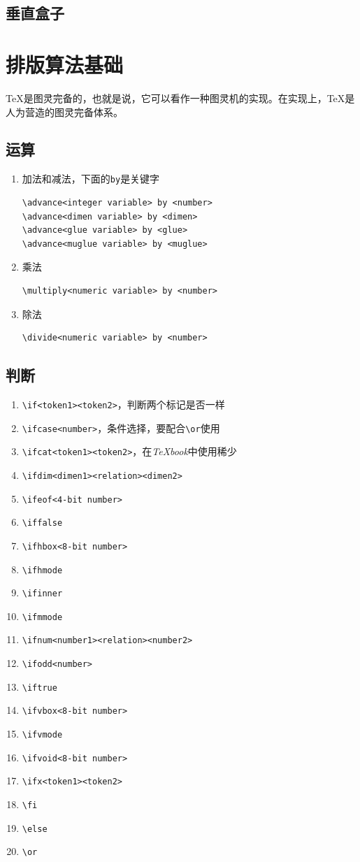 \documentclass{article}
\newcommand{\TeXbook}{\textit{\TeX book}}
\begin{document}
\subsection{垂直盒子}
\section{排版算法基础}
\TeX 是图灵完备的，也就是说，它可以看作一种图灵机的实现。在实现上，\TeX 是人为营造的图灵完备体系。
\subsection{运算}
\begin{enumerate}
\item 加法和减法，下面的\verb!by!是关键字
\begin{verbatim}
\advance<integer variable> by <number>
\advance<dimen variable> by <dimen>
\advance<glue variable> by <glue>
\advance<muglue variable> by <muglue>
\end{verbatim}
\item 乘法
\begin{verbatim}
\multiply<numeric variable> by <number>
\end{verbatim}
\item 除法
\begin{verbatim}
\divide<numeric variable> by <number>
\end{verbatim}
\end{enumerate}
\subsection{判断}
\begin{enumerate}
\item \verb!\if<token1><token2>!，判断两个标记是否一样
\item \verb!\ifcase<number>!，条件选择，要配合\verb!\or!使用
\item \verb!\ifcat<token1><token2>!，在\TeXbook 中使用稀少
\item \verb!\ifdim<dimen1><relation><dimen2>!
\item \verb!\ifeof<4-bit number>!
\item \verb!\iffalse!
\item \verb!\ifhbox<8-bit number>!
\item \verb!\ifhmode!
\item \verb!\ifinner!
\item \verb!\ifmmode!
\item \verb!\ifnum<number1><relation><number2>!
\item \verb!\ifodd<number>!
\item \verb!\iftrue!
\item \verb!\ifvbox<8-bit number>!
\item \verb!\ifvmode!
\item \verb!\ifvoid<8-bit number>!
\item \verb!\ifx<token1><token2>!
\item \verb!\fi!
\item \verb!\else!
\item \verb!\or!
\end{enumerate}
\end{document}
